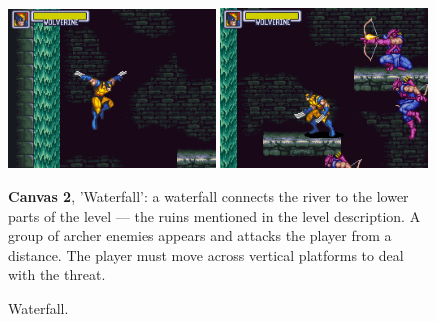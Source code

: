 \documentclass[english]{textolivre}
\begin{document}
\begin{figure}[htbp]
\begin{minipage}[t]{.47\textwidth}
\vspace{0pt}
\includegraphics[width=0.49\textwidth]{fig-5a.png}
\hfill
\includegraphics[width=0.49\textwidth]{fig-5b.png}
\caption{Waterfall.}
\label{fig-5ae5b}
\end{minipage}
\hfill
\begin{minipage}[t]{.47\textwidth}
\vspace{2pt}
\textbf{Canvas 2}, 'Waterfall': a waterfall connects the river to the lower parts of the level — the ruins mentioned in the level description. A group of archer enemies appears and attacks the player from a distance. The player must move across vertical platforms to deal with the threat.
\end{minipage}
\end{figure}
\end{document}
